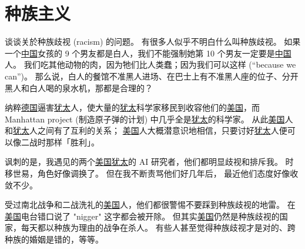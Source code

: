 \documentclass[12pt]{report}
\begin{document}


\chapter{种族主义}

谈谈关於种族歧视 (racism) 的问题。 有很多人似乎不明白什么叫种族歧视。 如果一个\underline{中国}女孩的 9 个男友都是白人，我们不能强制她第 10 个男友一定要是\underline{中国}人。 我们吃其他动物的肉，因为牠们比人类蠢；因为我们可以这样 (``because we can'')。 那么说，白人的餐馆不准黑人进场、在巴士上有不准黑人座的位子、分开黑人和白人喝的泉水机，那都是合理的？

纳粹\underline{德国}逼害\underline{犹太}人，使大量的\underline{犹太}科学家移民到收容他们的\underline{美国}，而 Manhattan project (制造原子弹的计划) 中几乎全是\underline{犹太}的科学家。 从此\underline{美国}人和\underline{犹太}人之间有了互利的关系； \underline{美国}人大概潜意识地相信，只要讨好\underline{犹太}人便可以像二战时那样「胜利」。

讽刺的是，我遇见的两个\underline{美国}\underline{犹太}的 AI 研究者，他们都明显歧视和排斥我。 时移世易，角色好像调换了。 但在我不断责骂他们好几年后， 最近他们态度好像收敛不少。

受过南北战争和二战洗礼的\underline{美国}人，他们都很警惕不要踩到种族歧视的地雷。 在\underline{美国}电台错口说了 "nigger" 这字都会被开除。 但其实\underline{美国}仍然是种族歧视的国家，每天都以种族为理由的战争在杀人。 有些人甚至觉得种族歧视才是对的、跨种族的婚姻是错的，等等。
\end{document}
